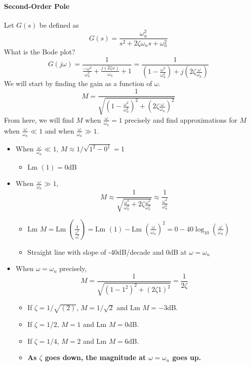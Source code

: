 \documentclass{book}
\newcommand{\jw}{j\omega}
\newcommand{\Lm}{\textrm{Lm }}
\begin{document}
\paragraph*{Second-Order Pole}
Let $ G(s)$ be defined as
\[ G(s) = \frac{\omega_n^2}{s^2+2\zeta\omega_ns+\omega_n^2} \]
What is the Bode plot?
\[ G(\jw) = \frac{1}{\frac{-\omega^2}{\omega_n^2}+\frac{j(2\zeta \omega)}{\omega_n}+1} = \frac{1}{\left( 1-\frac{\omega^2}{\omega_n^2} \right) + j\left( 2\zeta\frac{\omega}{\omega_n} \right)} \]
We will start by finding the gain as a function of $ \omega $.
\[ M = \frac{1}{\sqrt{\left( 1-\frac{\omega^2}{\omega_n^2} \right)^2+\left( 2\zeta\frac{\omega}{\omega_n} \right)^2}} \]
From here, we will find $ M $ when $ \frac{\omega}{\omega_n} = 1 $ precisely and find approximations for $ M $ when $ \frac{\omega}{\omega_n} \ll 1 $ and when $ \frac{\omega}{\omega_n} \gg 1 $. 
\begin{itemize}
	\item When $ \frac{\omega}{\omega_n} \ll 1 $, $ M\approx1/\sqrt{1^2-0^1}=1$
	\begin{itemize}
		\item $ \Lm(1) = 0 $dB
	\end{itemize}
	\item When \Large$ \frac{\omega}{\omega_n} $\normalsize$\gg 1 $,
	\[M\approx\frac{1}{\sqrt{\frac{\omega^4}{\omega_n^4}+2\zeta\frac{\omega^2}{\omega_n^2}}} \approx \frac{1}{\frac{\omega^2}{\omega_n^2}} \]
	\begin{itemize}
		\item $ \Lm M = \Lm\left(\frac{1}{\frac{\omega^2}{\omega_n^2}}\right) = \Lm(1) - \Lm\left(\frac{\omega}{\omega_n}\right)^2 = 0 - 40\log_{10}\left(\frac{\omega}{\omega_n}\right) $
		\item Straight line with slope of -40dB/decade and 0dB at $ \omega=\omega_n $
	\end{itemize}
	\item When $ \omega = \omega_n $ precisely,
	\[M = \frac{1}{\sqrt{(1-1^2)^2+(2\zeta1)^2}} =  \frac{1}{2\zeta} \]
	\begin{itemize}
		\item If $ \zeta = 1/\sqrt{(2)} $, $ M=1/\sqrt{2} $ and $ \Lm M = -3 $dB.
		\item If $ \zeta = 1/2 $, $ M=1 $ and $ \Lm M = 0 $dB.
		\item If $ \zeta = 1/4 $, $ M=2 $ and $ \Lm M = 6 $dB.
		\item \textbf{As $ \zeta $ goes down, the magnitude at $ \omega=\omega_n $ goes up.}
	\end{itemize}
\end{itemize}
\end{document}
